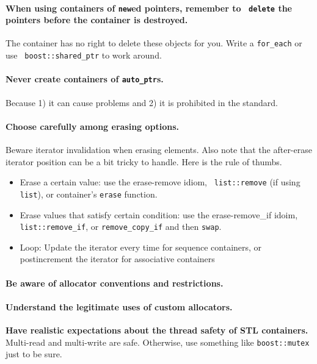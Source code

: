\documentclass{article}
\begin{document}
\paragraph{When using containers of {\tt new}ed pointers, remember to {\tt
delete} the pointers before the container is destroyed.}  The container has no
right to delete these objects for you.  Write a {\tt for\_each} or use {\tt
boost::shared\_ptr} to work around.

\paragraph{Never create containers of {\tt auto\_ptr}s.}  Because 1) it can
cause problems and 2) it is prohibited in the standard.

\paragraph{Choose carefully among erasing options.} Beware iterator
invalidation when erasing elements.  Also note that the after-erase iterator
position can be a bit tricky to handle.  Here is the rule of thumbs.

\begin{itemize} \item Erase a certain value: use the erase-remove idiom, {\tt
list::remove} (if using {\tt list}), or container's {\tt erase} function.
\item Erase values that satisfy certain condition: use the erase-remove\_if idoim, {\tt
list::remove\_if}, or {\tt remove\_copy\_if} and then {\tt swap}.  \item Loop:
Update the iterator every time for sequence containers, or postincrement the
iterator for associative containers \end{itemize}

\paragraph{Be aware of allocator conventions and restrictions.}

\paragraph{Understand the legitimate uses of custom allocators.}

{\bf Have realistic expectations about the thread safety of STL
containers.}  Multi-read and multi-write are safe.  Otherwise, use something
like {\tt boost::mutex} just to be sure.
\end{document}
